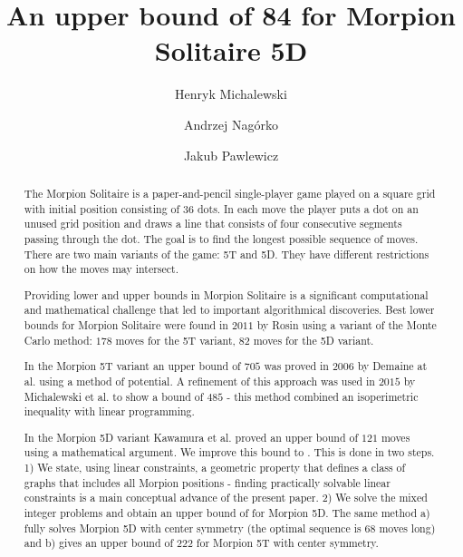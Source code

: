 \documentclass[a4paper,UKenglish]{lipics}
\title{{An upper bound of 84 for Morpion Solitaire 5D}}%
\author[1]{Henryk Michalewski}
\author[1]{Andrzej Nagórko}
\author[1]{Jakub Pawlewicz}
\affil[1]{Department of Mathematics, Informatics and Mechanics\\ University of Warsaw\\ \{H.Michalewski,A.Nagorko,J.Pawlewicz\}@mimuw.edu.pl} %
\begin{document}
\maketitle

\begin{abstract} 
The Morpion Solitaire is a paper-and-pencil single-player game played on a square grid with initial position consisting of $36$ dots.
In each move the player puts a dot on an unused grid position and draws a line that 
  consists of four consecutive segments passing through the dot.
 The goal is to find the longest possible sequence of moves.
There are two main variants of the game: 5T and 5D. 
They have different restrictions on how the moves may intersect.

Providing lower and upper bounds in Morpion Solitaire is a significant computational and mathematical challenge
  that led to important algorithmical discoveries.
 Best lower bounds for Morpion Solitaire were found in $2011$ by Rosin using a variant of the Monte Carlo method: 
 $178$ moves for the 5T variant, $82$ moves for the 5D variant.
 
 In the Morpion 5T variant an upper bound of $705$ was proved in $2006$ by Demaine at al. using a method of potential. 
A refinement of this approach was used in $2015$  by Michalewski et al. to show a bound of $485$ - this method combined an isoperimetric inequality with linear programming. 

In the Morpion 5D variant 
Kawamura et al. proved an upper bound of $121$ moves using a mathematical argument. 
We improve this bound to \therecord. 
This is done in two steps.
1) We state, using linear constraints, a geometric property that defines a class of graphs that includes all Morpion  positions - finding practically solvable linear constraints is a main conceptual advance of the present paper.
2) We solve the mixed integer problems and obtain 
an upper bound of \therecord for Morpion 5D. The same method a) fully solves Morpion 5D with center symmetry (the optimal sequence is $68$ moves long) and b) gives an upper bound of $222$ for Morpion 5T with center symmetry. 
\end{abstract}
\end{document}
